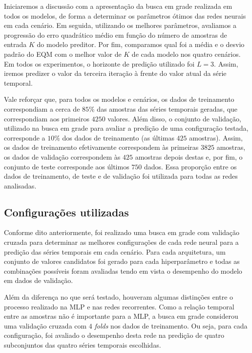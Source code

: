 \documentclass[a4paper, 12pt]{article}
\begin{document}
Iniciaremos a discussão com a apresentação da busca em grade realizada em todos os modelos, de forma a determinar os parâmetros ótimos das redes neurais em cada cenário. Em seguida, utilizando os melhores parâmetros, avaliamos a progressão do erro quadrático médio em função do número de amostras de entrada $K$ do modelo preditor. Por fim, comparamos qual foi a média e o desvio padrão do EQM com o melhor valor de $K$ de cada modelo nos quatro cenários. Em todos os experimentos, o horizonte de predição utilizado foi $L=3$. Assim, iremos predizer o valor da terceira iteração à frente do valor atual da série temporal.

Vale reforçar que, para todos os modelos e cenários, os dados de treinamento correspondiam a cerca de $85\%$ das amostras das séries temporais geradas, que correspondiam aos primeiros $4250$ valores. Além disso, o conjunto de validação, utilizado na busca em grade para avaliar a predição de uma configuração testada, corresponde a $10\%$ dos dados de treinamento (as últimas $425$ amostras). Assim, os dados de treinamento efetivamente correspondem às primeiras $3825$ amostras, os dados de validação correspondem às $425$ amostras depois destas e, por fim, o conjunto de teste corresponde aos últimos $750$ dados. Essa proporção entre os dados de treinamento, de teste e de validação foi utilizada para todas as redes analisadas.

\subsection{Configurações utilizadas}

Conforme dito anteriormente, foi realizado uma busca em grade com validação cruzada para determinar as melhores configurações de cada rede neural para a predição das séries temporais em cada cenário. Para cada arquitetura, um conjunto de valores candidatos foi gerado para cada hiperparâmetro e todas as combinações possíveis foram avaliadas tendo em vista o desempenho do modelo em dados de validação.

Além da diferença no que será testado, houveram algumas distinções entre o processo realizado na MLP e nas redes recorrentes. Como a relação temporal entre as amostras não é importante para a MLP, a busca em grade considerou uma validação cruzada com $4$ \textit{folds} nos dados de treinamento. Ou seja, para cada configuração, foi avaliado o desempenho desta rede na predição de quatro subconjuntos das quatro séries temporais escolhidas.
\end{document}
